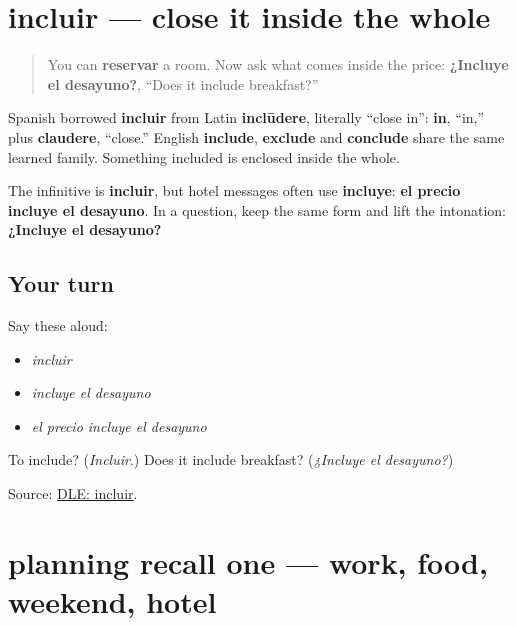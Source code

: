 \section[incluir]{incluir — close it inside the whole}

\label{lesson:ES-C409-incluir}



\begin{quote}
You can \textbf{reservar} a room. Now ask what comes inside the price: \textbf{¿Incluye el desayuno?}, “Does it include breakfast?”
\end{quote}

\begin{cousinweb}
Spanish borrowed \textbf{incluir} from Latin \textbf{inclūdere}, literally “close in”: \textbf{in}, “in,” plus \textbf{claudere}, “close.” English \textbf{include}, \textbf{exclude} and \textbf{conclude} share the same learned family. Something included is enclosed inside the whole.
\end{cousinweb}

\begin{grammarlens}[title={Grammar Lens: the useful third-person form}]
The infinitive is \textbf{incluir}, but hotel messages often use \textbf{incluye}: \textbf{el precio incluye el desayuno}. In a question, keep the same form and lift the intonation: \textbf{¿Incluye el desayuno?}
\end{grammarlens}

\subsection*{Your turn}
Say these aloud:

\begin{itemize}
\raggedright
  \item \emph{incluir}
  \item \emph{incluye el desayuno}
  \item \emph{el precio incluye el desayuno}
\end{itemize}

\begin{tcolorbox}[breakable,colback=teal!4,colframe=teal!35!black,title={Before you move on}]
To include? (\emph{Incluir}.) Does it include breakfast? (\emph{¿Incluye el desayuno?})

Source: \href{https://dle.rae.es/incluir}{DLE: incluir}.
\end{tcolorbox}
\section[(review)]{planning recall one — work, food, weekend, hotel}

